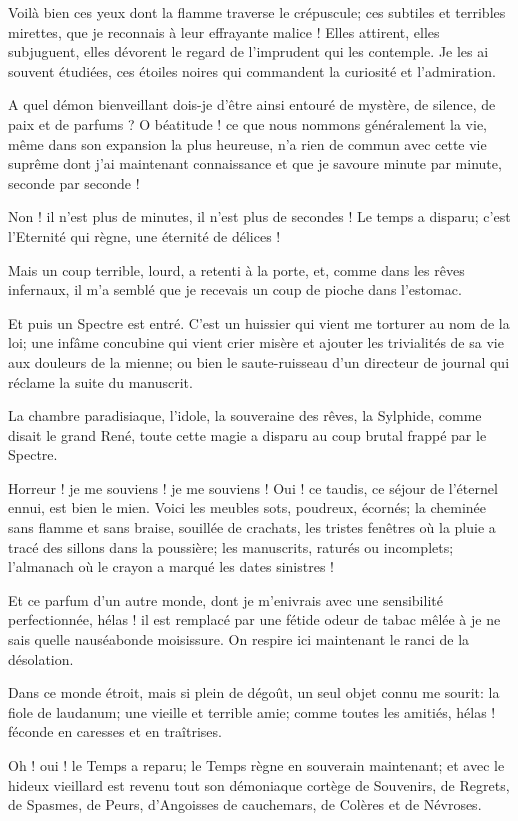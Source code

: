 Voilà bien ces yeux dont la flamme traverse le crépuscule; ces subtiles
et terribles mirettes, que je reconnais à leur effrayante malice !
Elles attirent, elles subjuguent, elles dévorent le regard de
l’imprudent qui les contemple. Je les ai souvent
étudiées, ces étoiles noires qui commandent la curiosité et
l’admiration.

A quel démon bienveillant dois{}-je d’être ainsi
entouré de mystère, de silence, de paix et de parfums ? O béatitude !
ce que nous nommons généralement la vie, même dans son expansion la
plus heureuse, n’a rien de commun avec cette vie
suprême dont j’ai maintenant connaissance et que je
savoure minute par minute, seconde par seconde !

Non ! il n’est plus de minutes, il
n’est plus de secondes ! Le temps a disparu;
c’est l’Eternité qui règne, une
éternité de délices !

Mais un coup terrible, lourd, a retenti à la porte, et, comme dans les
rêves infernaux, il m’a semblé que je recevais un coup
de pioche dans l’estomac.

Et puis un Spectre est entré. C’est un huissier qui
vient me torturer au nom de la loi; une infâme concubine qui vient
crier misère et ajouter les trivialités de sa vie aux douleurs de la
mienne; ou bien le saute{}-ruisseau d’un directeur de
journal qui réclame la suite du manuscrit.

La chambre paradisiaque, l’idole, la souveraine des
rêves, la Sylphide, comme disait le grand René, toute cette magie a
disparu au coup brutal frappé par le Spectre.

Horreur ! je me souviens ! je me souviens ! Oui ! ce taudis, ce séjour
de l’éternel ennui, est bien le mien. Voici les
meubles sots, poudreux, écornés; la cheminée sans flamme et sans
braise, souillée de crachats, les tristes fenêtres où la pluie a tracé
des sillons dans la poussière; les manuscrits, raturés ou incomplets;
l’almanach où le crayon a marqué les dates sinistres !

Et ce parfum d’un autre monde, dont je
m’enivrais avec une sensibilité perfectionnée, hélas !
il est remplacé par une fétide odeur de tabac mêlée à je ne sais quelle
nauséabonde moisissure. On respire ici maintenant le ranci de la
désolation.

Dans ce monde étroit, mais si plein de dégoût, un seul objet connu me
sourit: la fiole de laudanum; une vieille et terrible amie; comme
toutes les amitiés, hélas ! féconde en caresses et en traîtrises.

Oh ! oui ! le Temps a reparu; le Temps règne en souverain maintenant; et
avec le hideux vieillard est revenu tout son démoniaque cortège de
Souvenirs, de Regrets, de Spasmes, de Peurs,
d’Angoisses de cauchemars, de Colères et de Névroses.

